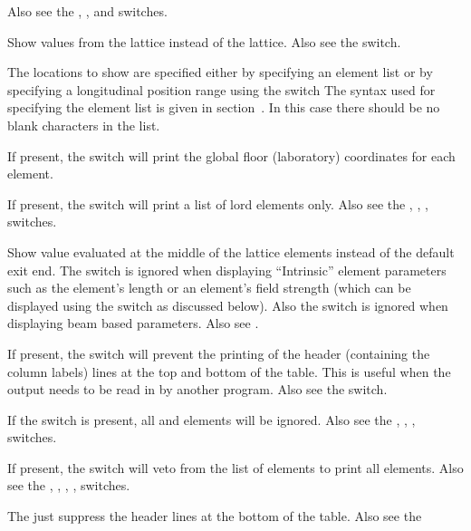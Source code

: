 {{{{{{{{\begin{description}
Also see the , , and  switches.
%
\item[-design] \Newline
Show values from the  lattice instead of the  lattice. Also see the 
switch.
%
\item[<element_list>] \Newline
The locations to show are specified either by specifying an element list or by specifying a
longitudinal position range using the  switch The syntax used for specifying the element list
is given in section~.  In this case there should be no blank characters in
the list.
%
\item[-floor_coords] \Newline
If present, the  switch will print the global floor (laboratory) coordinates for
each element.
%
\item[-lords] \Newline
If present, the  switch will print a list of lord elements only. Also see the
, , ,  switches.
%
\item[-middle] \Newline
Show value evaluated at the middle of the lattice elements instead of the default exit end.
The  switch is ignored when displaying ``Intrinsic'' element
parameters such as the element's length or an element's field strength (which can be displayed using
the  switch as discussed below). Also the  switch is ignored when
displaying beam based parameters. Also see .
%
\item[-no_label_lines] \Newline
If present, the  switch will prevent the printing of the header (containing the
column labels) lines at the top and bottom of the table.  This is useful when the output needs to be
read in by another program. Also see the  switch.
%
\item[-no_slaves] \Newline
If the  switch is present, all  and  elements
will be ignored. Also see the , , , 
switches.
%
\item[-no_super_slaves] \Newline
If present, the  switch will veto from the list of elements to print all
 elements. Also see the , , , ,
 switches.
%
\item[-no_tail_lines] \Newline
The  just suppress the header lines at the bottom of the table. Also see the

\end{description}}}}}}}}}
